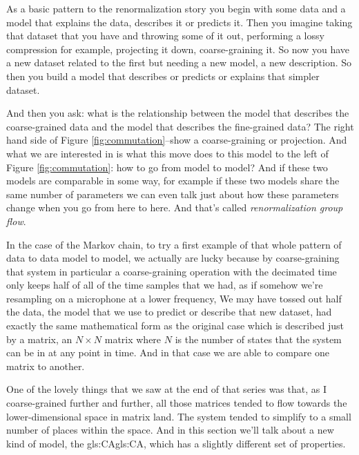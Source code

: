 \documentclass[]{article}
\begin{document}
As a basic pattern to the renormalization story you begin with some data
and a model that explains the data, describes it or predicts it.
Then you imagine taking that dataset that you have and throwing some of it out, performing a lossy compression for example, projecting it down, coarse-graining it.
So now you have a new dataset related to the first but needing a new model, a new description.
So then you build a model that describes or predicts or explains that simpler dataset.

And then you ask: what is the relationship between the model that describes the coarse-grained data and the model that describes the fine-grained data?
The right hand side of Figure \ref{fig:commutation}--show a coarse-graining or projection.
And what we are interested in is what this move does to this model to the left of Figure \ref{fig:commutation}: how to go from model to model? And if these two models
are comparable in some way, for example if these two models share the same number of parameters we can even talk just about how these parameters change when you go from here to here. And that's called \emph{renormalization group flow}.

In the case of the Markov chain, to try a first example of that whole pattern of data
to data model to model, we actually are lucky because by coarse-graining that system in particular a coarse-graining operation with the decimated time only keeps half of all of the time samples that we had, as if somehow we're resampling on a microphone at a lower frequency, We may have tossed out half the data, the model that we use to predict or describe that new dataset, had exactly the same mathematical form as the original case which is described just by a matrix, an $N \times N$ matrix
where $N$ is the number of states that the system can be in at any point in time.
And in that case we are able to compare one matrix to another.

One of the lovely things that we saw at the end of that
series was that, as I coarse-grained further and further, all those matrices tended to flow towards the lower-dimensional space in matrix land.
The system tended to simplify to a small number of places within the space.
And in this section we'll talk about a new kind of model, the \glsdesc{gls:CA}\gls{gls:CA}, which has a slightly different set of properties. 
\end{document}
